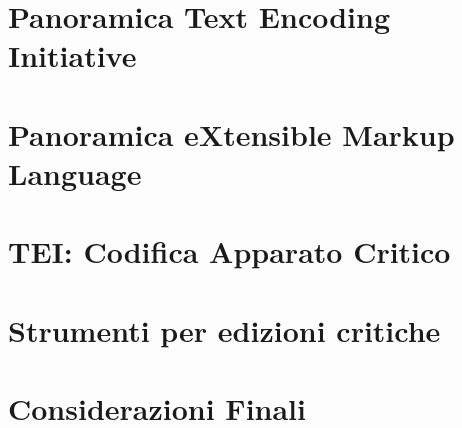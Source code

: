 \documentclass{beamer}
\begin{document}
\section{Panoramica Text Encoding Initiative}


\section{Panoramica eXtensible Markup Language}
%

\section{TEI: Codifica Apparato Critico}
%

\section{Strumenti per edizioni critiche}
%

\section{Considerazioni Finali}
%

%
\end{document}
